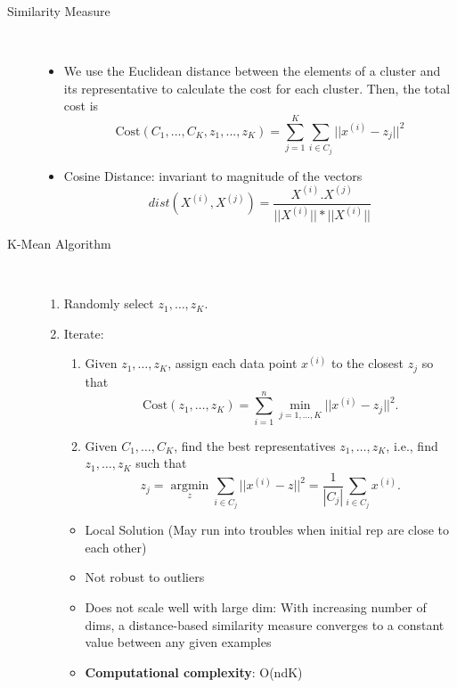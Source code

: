 \documentclass[a4paper, 10pt,landscape]{article}
\DeclareMathOperator*{\argmin}{argmin}
\begin{document}
\begin{multicols*}{3}
\begin{description}
	\item[Similarity Measure] ~
		\begin{itemize}
			\item We use the Euclidean distance between the elements of a cluster and its representative to calculate the cost for each cluster. Then, the total cost is
			$$\text{Cost}(C_1,...,C_K, z_1,...,z_K) = \sum_{j=1}^K \sum_{i \in C_j} || x^{(i)}-z_j||^2$$
			\item Cosine Distance: invariant to magnitude of the vectors
			$$dist(X^{(i)}, X^{(j)}) = \dfrac{X^{(i)} .  X^{(j)}}{||X^{(i)}|| *  ||X^{(i)}||}$$
		\end{itemize}

	\item[K-Mean Algorithm]~
		\begin{enumerate}
			\item Randomly select $z_1,\dots,z_K$.
			\item Iterate:
			\begin{enumerate}
				\item Given $z_1,\dots,z_K$, assign each data point $x^{(i)}$ to the closest $z_j$ so that
				$$\text{Cost}\left(z_1,\dots,z_K\right)=\sum_{i=1}^{n}\min\limits_{j=1,\dots,K}||x^{(i)}-z_j||^2.$$
				\item Given $C_1,\dots,C_K$, find the best representatives $z_1,\dots,z_K$, i.e., find $z_1,\dots,z_K$ such that
				$$z_j=\argmin\limits_{z}\sum_{i\in C_j}||{x^{(i)}-z}||^2=\dfrac{1}{\left|C_j\right|}\sum\limits_{i\in C_j}x^{(i)}.$$
			\end{enumerate}
			\begin{itemize}
				\item Local Solution (May run into troubles when initial rep are close to each other)
				\item Not robust to outliers
				\item Does not scale well with large dim: With increasing number of dims, a distance-based similarity measure converges to a constant value between any given examples
				\item {\bf Computational complexity}: O(ndK)
			\end{itemize}
		\end{enumerate}


\end{description}
\end{multicols*}
\end{document}
